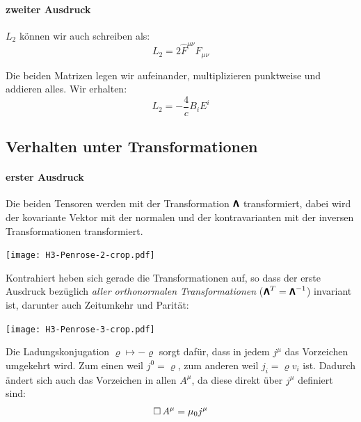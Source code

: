 \paragraph{zweiter Ausdruck}

%

$L_2$ können wir auch schreiben als:
\[
	L_2 = 2 \hat F^{\mu\nu} F_{\mu\nu}
\]

Die beiden Matrizen legen wir aufeinander, multiplizieren punktweise und
addieren alles. Wir erhalten:
\[
	L_2 = - \frac 4c B_i E^i
\]

\subsection{Verhalten unter Transformationen}

\paragraph{erster Ausdruck}

Die beiden Tensoren werden mit der Transformation $\boldsymbol{\mathsf{\Lambda}}$
transformiert, dabei wird der kovariante Vektor mit der normalen und der
kontravarianten mit der inversen Transformationen transformiert.
\begin{center}
	\texttt{[image: H3-Penrose-2-crop.pdf]}
\end{center}

Kontrahiert heben sich gerade die Transformationen auf, so dass der erste
Ausdruck bezüglich \emph{aller orthonormalen Transformationen} ($\boldsymbol{\mathsf{\Lambda}}^T = \boldsymbol{\mathsf{\Lambda}}^{-1}$) invariant ist, darunter auch Zeitumkehr und
Parität:
\begin{center}
	\texttt{[image: H3-Penrose-3-crop.pdf]}
\end{center}

Die Ladungskonjugation $\varrho \mapsto -\varrho$ sorgt dafür, dass in jedem $j^\mu$
das Vorzeichen umgekehrt wird. Zum einen weil $j^0 = \varrho$, zum anderen weil
$j_i = \varrho v_i$ ist. Dadurch ändert sich auch das Vorzeichen in allen $A^\mu$,
da diese direkt über $j^\mu$ definiert sind:
\[
	\operatorname{\Box} A^\mu = \mu_0 j^\mu
\]

